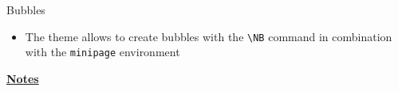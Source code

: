 \documentclass[10pt]{beamer}
\begin{document}

\begin{frame}
	{Bubbles}
	\begin{itemize}
		\item The theme allows to create bubbles with the \texttt{\textbackslash NB} command in combination with the \texttt{minipage} environment \bigskip
	\end{itemize}
	\begin{center}
		\begin{minipage}{.4\textwidth}
		\end{minipage}
	\end{center}
	\begin{center}
		\begin{minipage}{.6\textwidth}
		\end{minipage}
	\end{center}
	\begin{center}
		\begin{minipage}{.8\textwidth}
		\end{minipage}
	\end{center}
\end{frame}
\begin{flushleft}
	\underline{\textbf{Notes}}\setlength{\parskip}{.15cm}\notesize\newline\par
\end{flushleft}

\end{document}
